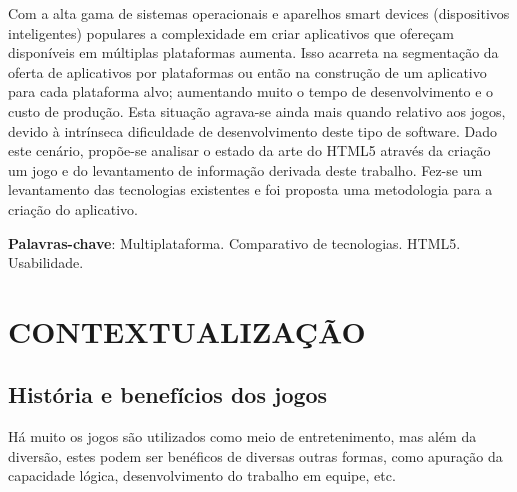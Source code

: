 \documentclass{article}
\begin{document}
Com a alta gama de sistemas operacionais e aparelhos smart devices (dispositivos inteligentes) populares a complexidade em criar aplicativos que ofereçam disponíveis em múltiplas plataformas aumenta. Isso acarreta na segmentação da oferta de aplicativos por plataformas ou então na construção de um aplicativo para cada plataforma alvo; aumentando muito o tempo de desenvolvimento e o custo de produção. Esta situação agrava-se ainda mais quando relativo aos jogos, devido à intrínseca dificuldade de desenvolvimento deste tipo de software. Dado este cenário, propõe-se analisar o estado da arte do HTML5 através da criação um jogo e do levantamento de informação derivada deste trabalho.  Fez-se um levantamento das tecnologias existentes e foi proposta uma metodologia para a criação do aplicativo.

\textbf{Palavras-chave}: Multiplataforma. Comparativo de tecnologias. HTML5. Usabilidade.

\newpage

\listoffigures  
\listoftables
\newpage

\tableofcontents
\newpage

\section{CONTEXTUALIZAÇÃO}
\subsection{História e benefícios dos jogos}
\indent Há muito os jogos são utilizados como meio de entretenimento, mas além da diversão, estes podem ser benéficos de diversas outras formas, como apuração da capacidade lógica, desenvolvimento do trabalho em equipe, etc.
\end{document}
